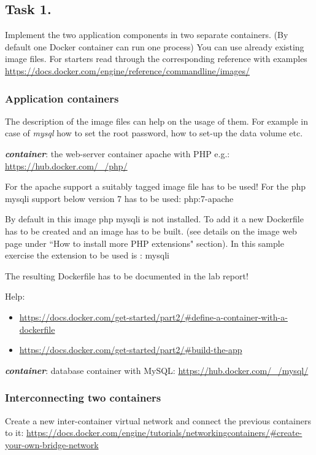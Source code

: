 \documentclass[a4paper]{article}
\begin{document}
\subsection{Task 1.}

Implement the two application components in two separate containers. (By default one Docker container can run one
process)
You can use already existing image files. For starters read through the corresponding reference with examples
\url{https://docs.docker.com/engine/reference/commandline/images/}

\subsubsection{Application containers}
The description of the image files can help on the usage of them. For example in case of \emph{mysql} how to set the
root password, how to set-up the data volume etc.

\textbf{\emph{ container}}: the web-server container apache with PHP e.g.: \url{https://hub.docker.com/_/php/}

For the apache support a suitably tagged image file has to be used! For the php mysqli support below version 7 has to
be used: php:7-apache

By default in this image php mysqli is not installed. To add it a new Dockerfile has to be created and an image has to
be built. (see details on the image web page under ``How to install more PHP extensions" section). In this sample
exercise the extension to be used is : mysqli

The resulting Dockerfile has to be documented in the lab report!

Help:
\begin{itemize}
    \item \url{https://docs.docker.com/get-started/part2/#define-a-container-with-a-dockerfile}
    \item \url{https://docs.docker.com/get-started/part2/#build-the-app}
\end{itemize}

\textbf{\emph{ container}}: database container with MySQL: \url{https://hub.docker.com/_/mysql/}

\subsubsection{Interconnecting two containers}
Create a new inter-container virtual network and connect the previous containers to it:
\url{https://docs.docker.com/engine/tutorials/networkingcontainers/#create-your-own-bridge-network}
\end{document}
